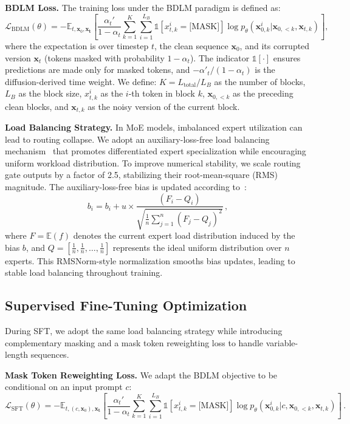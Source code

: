 \noindent
\textbf{BDLM Loss.}
The training loss under the BDLM paradigm is defined as:
\begin{equation}\label{eq:bdlm}
    \mathcal{L}_{\text{BDLM}}(\theta) = - \mathbb{E}_{t, \bm{x}_0, \bm{x_t}} \left[ \frac{\alpha_{t}'}{1-\alpha_{t}}\sum_{k=1}^{K} \sum_{i=1}^{L_B} \mathbb{1}[x_{t,k}^i=\text{[MASK]}] \log p_{\theta}(\bm{x}_{0,k}^i | \bm{x}_{0,<k}, \bm{x}_{t,k}) \right],
\end{equation}
where the expectation is over timestep $t$, the clean sequence $\bm{x}_0$, and its corrupted version $\bm{x}_t$ (tokens masked with probability $1 - \alpha_t$). 
The indicator $\mathbb{1}[\cdot]$ ensures predictions are made only for masked tokens, and $-\alpha'_t / (1 - \alpha_t)$ is the diffusion-derived time weight. 
We define: $K = L_{\text{total}} / L_B$ as the number of blocks, $L_B$ as the block size, $x^i_{t,k}$ as the $i$-th token in block $k$, $\bm{x}_{0,<k}$ as the preceding clean blocks, and $\bm{x}_{t,k}$ as the noisy version of the current block.

\noindent
\textbf{Load Balancing Strategy.}
In MoE models, imbalanced expert utilization can lead to routing collapse.
%
We adopt an auxiliary-loss-free load balancing mechanism~\citep{deepseekv3} that promotes differentiated expert specialization while encouraging uniform workload distribution.
%
To improve numerical stability, we scale routing gate outputs by a factor of 2.5, stabilizing their root-mean-square (RMS) magnitude.
%
The auxiliary-loss-free bias is updated according to~\citep{sjl_moe}:
\begin{equation}
b_{i}=b_{i}+u\times \frac{(F_{i}-Q_{i})}{\sqrt{\frac{1}{n}\sum_{j=1}^{n}{(F_{j}-Q_{j})^2}}} \,,
\end{equation}
where $F=\mathbb{E}(f)$ denotes the current expert load distribution induced by the bias $b$, and $Q=[\frac{1}{n},\frac{1}{n},\dots,\frac{1}{n}]$ represents the ideal uniform distribution over $n$ experts. 
This RMSNorm-style normalization smooths bias updates, leading to stable load balancing throughout training.

\subsection{Supervised Fine-Tuning Optimization}
During SFT, we adopt the same load balancing strategy while introducing complementary masking and a mask token reweighting loss to handle variable-length sequences.

\noindent
\textbf{Mask Token Reweighting Loss.}
We adapt the BDLM objective to be conditional on an input prompt $c$:
\begin{equation}\label{eq:bdlm}
    \mathcal{L}_{\text{SFT}}(\theta) = - \mathbb{E}_{t, (c,\bm{x}_0), \bm{x_t}} \left[ \frac{\alpha_{t}'}{1-\alpha_{t}}\sum_{k=1}^{K} \sum_{i=1}^{L_B} \mathbb{1}[x_{t,k}^i=\text{[MASK]}] \log p_{\theta}(\bm{x}_{0,k}^i | c,\bm{x}_{0,<k}, \bm{x}_{t,k}) \right] \,.
\end{equation}

